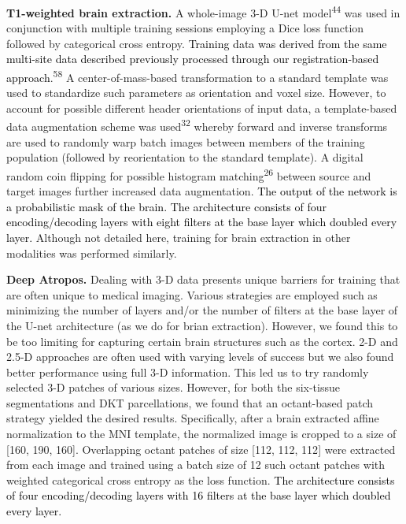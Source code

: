 \documentclass[
  12pt,
]{article}
\begin{document}
\textbf{T1-weighted brain extraction.} A whole-image 3-D U-net
model\textsuperscript{44} was used in conjunction with multiple training
sessions employing a Dice loss function followed by categorical cross
entropy. \textcolor{black}{Training data
was derived from the same multi-site data described previously processed through
our registration-based approach}.\textsuperscript{58} A
center-of-mass-based transformation to a standard template was used to
standardize such parameters as orientation and voxel size. However, to
account for possible different header orientations of input data, a
template-based data augmentation scheme was used\textsuperscript{32}
whereby forward and inverse transforms are used to randomly warp batch
images between members of the training population (followed by
reorientation to the standard template). A digital random coin flipping
for possible histogram matching\textsuperscript{26} between source and
target images further increased data augmentation.
\textcolor{black}{The output of the network
is a probabilistic mask of the brain.}
\textcolor{black}{The architecture
consists of four encoding/decoding layers with eight filters at the base layer
which doubled every layer.} Although not detailed here, training for
brain extraction in other modalities was performed similarly.

\textbf{Deep Atropos.} Dealing with 3-D data presents unique barriers
for training that are often unique to medical imaging. Various
strategies are employed such as minimizing the number of layers and/or
the number of filters at the base layer of the U-net architecture (as we
do for brian extraction). However, we found this to be too limiting for
capturing certain brain structures such as the cortex. 2-D and 2.5-D
approaches are often used with varying levels of success but we also
found better performance using full 3-D information. This led us to try
randomly selected 3-D patches of various sizes. However, for both the
six-tissue segmentations and DKT parcellations, we found that an
octant-based patch strategy yielded the desired results. Specifically,
after a brain extracted affine normalization to the MNI template, the
normalized image is cropped to a size of {[}160, 190, 160{]}.
Overlapping octant patches of size {[}112, 112, 112{]} were extracted
from each image and trained using a batch size of 12 such octant patches
with weighted categorical cross entropy as the loss function.
\textcolor{black}{The architecture consists of four encoding/decoding
layers with 16 filters at the base layer which doubled every layer.}
\end{document}
